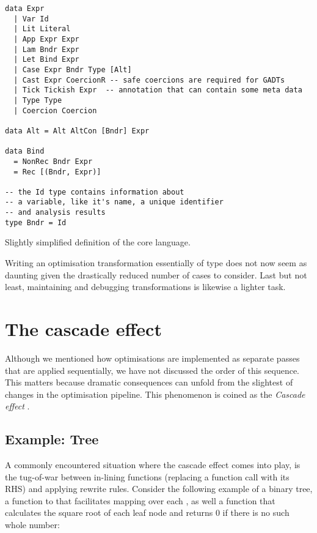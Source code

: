 \begin{listing}[H]
\begin{verbatim}
data Expr
  | Var Id
  | Lit Literal
  | App Expr Expr
  | Lam Bndr Expr
  | Let Bind Expr
  | Case Expr Bndr Type [Alt]
  | Cast Expr CoercionR -- safe coercions are required for GADTs
  | Tick Tickish Expr  -- annotation that can contain some meta data
  | Type Type
  | Coercion Coercion
  
data Alt = Alt AltCon [Bndr] Expr
 
data Bind
  = NonRec Bndr Expr
  = Rec [(Bndr, Expr)]
  
-- the Id type contains information about
-- a variable, like it's name, a unique identifier
-- and analysis results
type Bndr = Id
\end{verbatim}
\caption{Slightly simplified definition of the core language.}
\label{code:core_def}
\end{listing}

Writing an optimisation transformation essentially of type \hs{[Bind] -> [Bind]} does not now seem
as daunting given the drastically reduced number of cases to consider. 
Last but not least, maintaining and debugging transformations is likewise a lighter task.

\section{The cascade effect}

Although we mentioned how optimisations are implemented as separate passes that are applied sequentially, we have
not discussed the order of this sequence. This matters because dramatic consequences can unfold from the slightest of
changes in the optimisation pipeline. This phenomenon is coined as the \textit{Cascade effect} \cite{haskell_optimisations_1997}.

\subsection{Example: Tree}
A commonly encountered situation where the cascade effect comes into play,
is the tug-of-war between in-lining functions (replacing a function call with its RHS) and applying rewrite rules. Consider
the following example of a binary tree,  a function to that facilitates mapping over each , as well a function
that calculates the square root of each leaf node and returns 0 if there is no such whole number:

